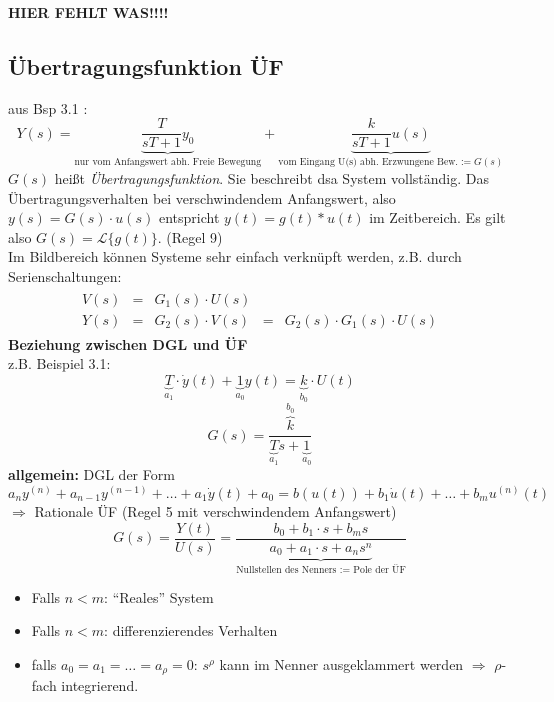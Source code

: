 \documentclass[12pt,a4paper,ngerman]{scrartcl}
\begin{document}
\textbf{HIER FEHLT WAS!!!!}

\subsection{Übertragungsfunktion ÜF}

aus Bsp 3.1 :
\begin{equation*}
  Y(s)= \underbrace{\frac{T}{sT+1}y_0}_{\text{nur vom Anfangswert abh. Freie Bewegung}} + \underbrace{\frac{k}{sT+1}u(s)}_{\text{vom Eingang U(s) abh. Erzwungene Bew.}:=G(s)}
\end{equation*}
$G(s)$ heißt \emph{Übertragungsfunktion}. Sie beschreibt dsa System vollständig. Das Übertragungsverhalten bei verschwindendem Anfangswert, also $y(s)=G(s)\cdot u(s)$ entspricht $y(t)=g(t)*u(t)$ im Zeitbereich. Es gilt also $G(s)=\mathcal{L}\{g(t)\}$. (Regel 9)\\
Im Bildbereich können Systeme sehr einfach verknüpft werden, z.B. durch Serienschaltungen:
\begin{align*}
  \begin{array}{lllll}
    V(s)&=&G_1(s)\cdot U(s)\\
    Y(s)&=&G_2(s)\cdot V(s)&=&G_2(s)\cdot G_1(s)\cdot U(s)
  \end{array}
\end{align*}
\textbf{Beziehung zwischen DGL und ÜF}\\
z.B. Beispiel 3.1:
\begin{equation*}
  \underbrace{T}_{a_1}\cdot \dot{y}(t) +\underbrace{1}_{a_0}y(t)=\underbrace{k}_{b_0}\cdot U(t)
\end{equation*}
\begin{equation*}
  G(s)=\frac{\overbrace{k}^{b_0}}{\underbrace{T}_{a_1}s+\underbrace{1}_{a_0}}
\end{equation*}
\textbf{allgemein:} DGL der Form\\
\begin{equation*}
  a_ny^{(n)}+a_{n-1}y^{(n-1)}+\dots +a_1\dot{y}(t)+a_0=b(u(t))+b_1\dot{u}(t)+\dots +b_mu^{(n)}(t)
\end{equation*}
$\Rightarrow$ Rationale ÜF (Regel 5 mit verschwindendem Anfangswert)
\begin{equation*}
  G(s)=\frac{Y(t)}{U(s)}= \frac{b_0+b_1\cdot s + b_ms}{\underbrace{a_0+a_1\cdot s +a_ns^n}_{\text{Nullstellen des Nenners }:=\text{ Pole der ÜF}}}
\end{equation*}
\begin{itemize}
\item Falls $n<m$: ``Reales'' System
\item Falls $n<m$: differenzierendes Verhalten
\item falls $a_0=a_1=\dots=a_\rho =0$: $s^\rho$ kann im Nenner ausgeklammert werden $\Rightarrow$ $\rho$-fach integrierend. 
\end{itemize}
\end{document}
